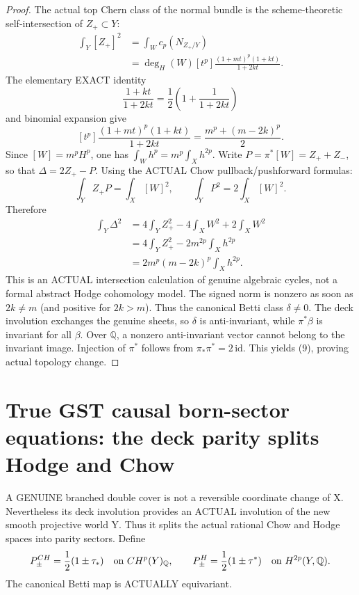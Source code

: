 \documentclass[11pt]{article}
\newcommand{\Q}{\mathbb Q}
\begin{document}
\begin{proof}
The actual top Chern class of the normal bundle is
the scheme-theoretic self-intersection of
\(Z_+\subset Y\):
\[
 \begin{split}
  \int_Y[Z_+]^2
    &=\int_W c_p(N_{Z_+/Y})\\
    &=\deg_H(W)
       [t^p]\frac{(1+mt)^p(1+kt)}{1+2kt}.
 \end{split}
\]
The elementary EXACT identity
\[
 \frac{1+kt}{1+2kt}
   =\frac12\left(1+\frac1{1+2kt}\right)
\]
and binomial expansion give
\[
 \boxed{
 [t^p]\frac{(1+mt)^p(1+kt)}{1+2kt}
        =\frac{m^p+(m-2k)^p}{2}.
 }                                                        \tag{10}
\]
Since \([W]=m^pH^p\), one has
\(\int_W h^p=m^p\int_Xh^{2p}\).
Write \(P=\pi^*[W]=Z_++Z_-\), so that
\(\Delta=2Z_+-P\). Using the ACTUAL Chow
pullback/pushforward formulas:
\[
 \int_Y Z_+P=\int_X[W]^2,\qquad
 \int_Y P^2=2\int_X[W]^2.
\]
Therefore
\[
 \begin{split}
  \int_Y\Delta^2
    &=4\int_YZ_+^2
       -4\int_XW^2+2\int_XW^2\\
    &=4\int_YZ_+^2
       -2m^{2p}\int_Xh^{2p}\\
    &=2m^p(m-2k)^p\int_Xh^{2p}.
 \end{split}
\]
This is an ACTUAL intersection calculation of
genuine algebraic cycles, not a formal
abstract Hodge cohomology model.
The signed norm is nonzero as soon as \(2k\ne m\)
(and positive for \(2k>m\)).
Thus the canonical Betti class \(\delta\ne0\).
The deck involution exchanges the genuine
sheets, so \(\delta\) is anti-invariant, while
\(\pi^*\beta\) is invariant for all \(\beta\).
Over \(\Q\), a nonzero anti-invariant vector
cannot belong to the invariant image.
Injection of \(\pi^*\) follows from
\(\pi_*\pi^*=2\,\mathrm{id}\).
This yields (9), proving actual topology change.
\end{proof}

\section{True GST causal born-sector equations: the deck parity splits Hodge and Chow}
A GENUINE
branched double
cover is not
a reversible
coordinate change
of X.
Nevertheless
its deck
involution
provides an
ACTUAL
involution of
the new
smooth
projective
world Y.
Thus it
splits the
actual
rational
Chow and
Hodge spaces
into parity
sectors.
Define
\[
 P_\pm^{CH}
  =\frac12(1\pm\tau_*)
 \quad\hbox{on }CH^p(Y)_\Q,
 \qquad
 P_\pm^{H}
  =\frac12(1\pm\tau^*)
 \quad\hbox{on }H^{2p}(Y,\Q).
\]
The canonical
Betti map is
ACTUALLY
equivariant.
\end{document}
